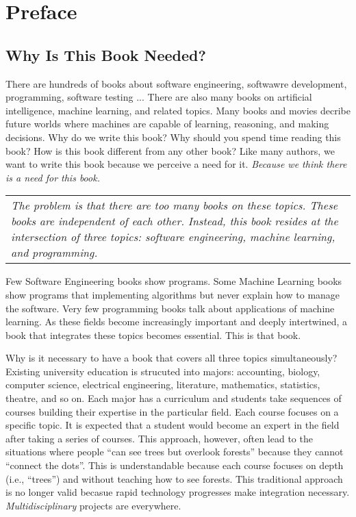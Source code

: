 \chapter*{Preface}

\section*{Why Is This Book Needed?}

There are hundreds of books about software engineering, softwawre
development, programming, software testing ...  There are also many
books on artificial intelligence, machine learning, and related
topics. Many books and movies decribe future worlds where machines are
capable of learning, reasoning, and making decisions.
Why do we write this book?  Why should you spend time reading
this book?  How is this book different from any other book?  Like many
authors, we want to write this book because we perceive a need for it.
{\it Because we think there is a need for this book.}


\begin{tabular}{|p{4in}|}
  {\it The problem is that there are too many books on these topics.
    These books are independent of each other.  Instead, this book
    resides at the intersection of three topics: software engineering,
    machine learning, and programming.  }
\end{tabular}  

Few Software Engineering books show programs. Some Machine Learning
books show programs that implementing algorithms but never explain how
to manage the software.  Very few programming books talk about
applications of machine learning.  As these fields become increasingly
important and deeply intertwined, a book that integrates these topics
becomes essential.  This is that book.

Why is it necessary to have a book that covers all three topics
simultaneously?  Existing university education is strucuted into
majors: accounting, biology, computer science, electrical engineering,
literature, mathematics, statistics, theatre, and so on.  Each major
has a curriculum and students take sequences of courses building their
expertise in the particular field. Each course focuses on a specific
topic.  It is expected that a student would become an expert in the
field after taking a series of courses.  This approach, however, often
lead to the situations where people ``can see trees but overlook
forests'' because they cannot ``connect the dots''.  This is
understandable because each course focuses on depth (i.e., ``trees'')
and without teaching how to see forests.  This traditional approach is
no longer valid becasue rapid technology progresses make integration
necessary.  {\it Multidisciplinary} projects are everywhere.

